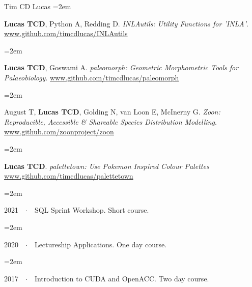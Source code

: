 \documentclass{scrartcl}
\newcommand{\Description}[1]{\hangindent=2em\hangafter=0\noindent\raggedright\footnotesize{#1}\par\normalsize\vspace{1em}} %
\begin{document}
\begin{cv}{Tim {\Large CD} Lucas}
\Description{\textbf{Lucas TCD}, Python A, Redding D. \emph{INLAutils: Utility Functions for 'INLA'}. \url{www.github.com/timcdlucas/INLAutils}}


\Description{\textbf{Lucas TCD}, Goswami A. \emph{paleomorph: Geometric Morphometric Tools for Palaeobiology}. \url{www.github.com/timcdlucas/paleomorph}}

\Description{August T, \textbf{Lucas TCD}, Golding N, van Loon E, McInerny G. \emph{Zoon: Reproducible, Accessible \& Shareable Species Distribution Modelling}. \url{www.github.com/zoonproject/zoon}}

\Description{\textbf{Lucas TCD}. \emph{palettetown: Use Pokemon Inspired Colour Palettes} \url{www.github.com/timcdlucas/palettetown}}





\vspace{1em} %


{\color{Maroon}}\vspace{1em}

\Description{2021\ \ $\cdotp$\ \ SQL Sprint Workshop. Short course.}
\vspace{-0.5em} %
\Description{2020\ \ $\cdotp$\ \ Lectureship Applications. One day course.}
\vspace{-0.5em} %
\Description{2017\ \ $\cdotp$\ \ Introduction to CUDA and OpenACC. Two day course.}
\vspace{-0.5em} %

\vspace{1em} %

\clearpage
{\color{Maroon}}\vspace{-1em}


\end{cv}
\end{document}
